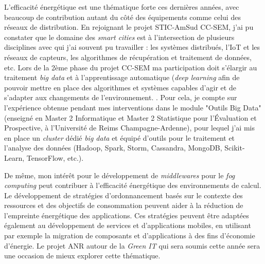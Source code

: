 L'efficacité énergétique est une thématique forte ces dernières années, avec beaucoup de contribution autant du côté des équipements comme celui des réseaux de distribution. En rejoignant le projet STIC-AmSud CC-SEM, j'ai pu constater que le domaine des \textit{smart cities} est à l'intersection de plusieurs disciplines avec qui j'ai souvent pu travailler : les systèmes distribués, l'IoT et les réseaux de capteurs, les algorithmes de récupération et traitement de données, etc. Lors de la 2ème phase du projet CC-SEM ma participation doit s'élargir au traitement \textit{big data} et à l'apprentissage automatique (\textit{deep learning} afin de pouvoir mettre en place des algorithmes et systèmes capables d'agir et de s'adapter aux changements de l'environnement. . Pour cela,  je compte sur l'expérience obtenue pendant mes interventions dans le module "Outils Big Data" (enseigné en Master 2 Informatique et Master 2 Statistique pour l'Évaluation et Prospective, à l'Université de Reims Champagne-Ardenne), pour lequel j'ai mis en place un \textit{cluster} dédié \textit{big data} et équipé d'outils pour le traitement et l'analyse des données (Hadoop, Spark, Storm, Cassandra, MongoDB, Scikit-Learn, TensorFlow, etc.). 

De même, mon intérêt pour le développement de \textit{middlewares} pour le \textit{fog computing} peut contribuer à l'efficacité énergétique des environnements de calcul. Le développement de stratégies d'ordonnancement basés sur le contexte des ressources et des objectifs de consommation peuvent aider à la réduction de l'empreinte énergétique des applications. Ces stratégies peuvent être adaptées également au développement de services et d'applications mobiles, en utilisant par exemple la migration de composants et d’applications à des fins d’économie d’énergie. Le projet ANR autour de la \textit{Green IT} qui sera soumis cette année sera une occasion de mieux explorer cette thématique.

 


%
%
%
%
%
%
%
%	